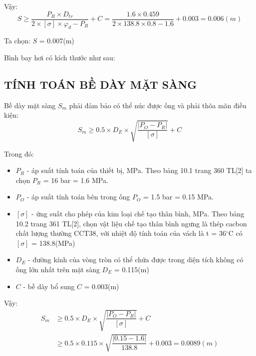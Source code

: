 Vậy:
\begin{equation*}
	S \geq \dfrac{P_{R}\times D_{tr}}{2\times [\sigma]\times\varphi_{d} - P_{R}} + C = \dfrac{1.6 \times 0.459}{2 \times 138.8 \times 0.8 - 1.6}+0.003 = 0.006(m)
\end{equation*}

Ta chọn: $S$ = 0.007(m)

Bình bay hơi có kích thước như sau:

\subsection{TÍNH TOÁN BỀ DÀY MẶT SÀNG}
Bề dày mặt sàng $S_{m}$ phải đảm bảo có thể núc được ống và phải thõa mãn điều kiện:
\begin{equation*}
	S_{m} \geq 0.5\times D_{E}\times \sqrt{\dfrac{|P_{O} - P_{R}|}{[\sigma]}} + C
\end{equation*}

Trong đó:
\begin{itemize}
	\item $P_{R}$ - áp suất tính toán của thiết bị, MPa. Theo bảng 10.1 trang 360 TL[2] ta chọn $P_{R}$ = 16 bar = 1.6  MPa.
	\item $P_{O}$ - áp suất tính toán bên trong ống $P_{O}$ = 1.5 bar = 0.15 MPa.
	\item $[\sigma]$ - ứng suất cho phép của kim loại chế tạo thân bình, MPa. Theo bảng 10.2 trang 361 TL[2], chọn vật liệu chế tạo thân bình ngưng là thép cacbon chất lượng thường CCT38, với nhiệt độ tính toán của vách là t = 36$^{\circ}$C có $[\sigma]$ = 138.8(MPa)	
	\item $D_{E}$ - đường kính của vòng tròn có thể chứa được trong diện tích không có ống lớn nhất trên mặt sàng $D_{E}$ = 0.115(m)
	\item $C$ - bề dày bổ sung $C$ = 0.003(m)
\end{itemize}

Vậy:
\begin{equation*}
	\begin{split}
		S_{m} &\geq 0.5\times D_{E}\times \sqrt{\dfrac{|P_{O} - P_{R}|}{[\sigma]}} + C\\
		&\geq 0.5 \times 0.115 \times \sqrt{\dfrac{|0.15-1.6|}{138.8}} + 0.003 = 0.0089(m)
	\end{split}
\end{equation*}

